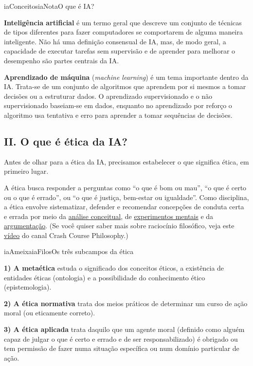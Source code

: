 \documentclass[
  11pt,
]{article}
\newenvironment{filosofia}[1][Conceito filosofico]{\begin{iabox}{iaAmeixa}{iaFilos}{#1}}{\end{iabox}}
\newenvironment{tecnica}[1][Nota tecnica]{\begin{iabox}{iaConceitos}{iaNota}{#1}}{\end{iabox}}
\begin{document}
\begin{tecnica}[O que é IA?]

\textbf{Inteligência artificial} é um termo geral que descreve um
conjunto de técnicas de tipos diferentes para fazer computadores se
comportarem de alguma maneira inteligente. Não há uma definição
consensual de IA, mas, de modo geral, a capacidade de executar tarefas
sem supervisão e de aprender para melhorar o desempenho são partes
centrais da IA.

\textbf{Aprendizado de máquina} (\emph{machine learning}) é um tema
importante dentro da IA. Trata-se de um conjunto de algoritmos que
aprendem por si mesmos a tomar decisões ou a estruturar dados. O
aprendizado supervisionado e o não supervisionado baseiam-se em dados,
enquanto no aprendizado por reforço o algoritmo usa tentativa e erro
para aprender a tomar sequências de decisões.

\end{tecnica}

\subsection{II. O que é ética da
IA?}\label{ii.-o-que-uxe9-uxe9tica-da-ia}

Antes de olhar para a ética da IA, precisamos estabelecer o que
significa ética, em primeiro lugar.

A ética busca responder a perguntas como ``o que é bom ou mau'', ``o que
é certo ou o que é errado'', ou ``o que é justiça, bem-estar ou
igualdade''. Como disciplina, a ética envolve sistematizar, defender e
recomendar concepções de conduta certa e errada por meio da
\href{https://en.wikipedia.org/wiki/Philosophical_analysis}{análise
conceitual}, de
\href{https://plato.stanford.edu/entries/thought-experiment/}{experimentos
mentais} e da \href{https://iep.utm.edu/argument/}{argumentação}. (Se
você quiser saber mais sobre raciocínio filosófico, veja este
\href{https://www.youtube.com/watch?v=NKEhdsnKKHs}{vídeo} do canal Crash
Course Philosophy.)

\begin{filosofia}[Os três subcampos da ética]

\textbf{1) A metaética} estuda o significado dos conceitos éticos, a
existência de entidades éticas (ontologia) e a possibilidade do
conhecimento ético (epistemologia).

\textbf{2) A ética normativa} trata dos meios práticos de determinar um
curso de ação moral (ou eticamente correto).

\textbf{3) A ética aplicada} trata daquilo que um agente moral (definido
como alguém capaz de julgar o que é certo e errado e de ser
responsabilizado) é obrigado ou tem permissão de fazer numa situação
específica ou num domínio particular de ação.

\end{filosofia}
\end{document}

